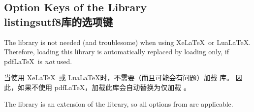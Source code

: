 \subsection{Option Keys of the  Library\\listingsutf8库的选项键}

\begin{marker}
The  library is not needed (and troublesome) when using Xe\LaTeX\ or Lua\LaTeX.
Therefore, loading this library is automatically replaced by loading
 only, if pdf\LaTeX\ is \emph{not} used.

当使用 Xe\LaTeX\ 或 Lua\LaTeX 时，不需要（而且可能会有问题）加载  库。 因此，如果不使用 pdf\LaTeX，加载此库会自动替换为仅加载 。
\end{marker}

The  library is an extension of the
 library, so
all options from  are applicable.


